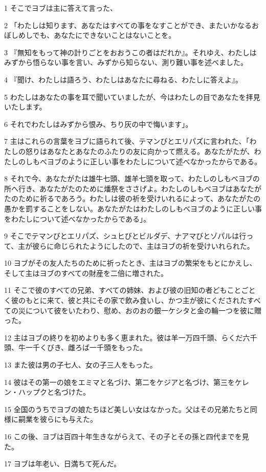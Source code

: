 \par 1 そこでヨブは主に答えて言った、
\par 2 「わたしは知ります、あなたはすべての事をなすことができ、またいかなるおぼしめしでも、あなたにできないことはないことを。
\par 3 『無知をもって神の計りごとをおおうこの者はだれか』。それゆえ、わたしはみずから悟らない事を言い、みずから知らない、測り難い事を述べました。
\par 4 『聞け、わたしは語ろう、わたしはあなたに尋ねる、わたしに答えよ』。
\par 5 わたしはあなたの事を耳で聞いていましたが、今はわたしの目であなたを拝見いたします。
\par 6 それでわたしはみずから恨み、ちり灰の中で悔います」。
\par 7 主はこれらの言葉をヨブに語られて後、テマンびとエリパズに言われた、「わたしの怒りはあなたとあなたのふたりの友に向かって燃える。あなたがたが、わたしのしもべヨブのように正しい事をわたしについて述べなかったからである。
\par 8 それで今、あなたがたは雄牛七頭、雄羊七頭を取って、わたしのしもべヨブの所へ行き、あなたがたのために燔祭をささげよ。わたしのしもべヨブはあなたがたのために祈るであろう。わたしは彼の祈を受けいれるによって、あなたがたの愚かを罰することをしない。あなたがたはわたしのしもべヨブのように正しい事をわたしについて述べなかったからである」。
\par 9 そこでテマンびとエリパズ、シュヒびとビルダデ、ナアマびとゾパルは行って、主が彼らに命じられたようにしたので、主はヨブの祈を受けいれられた。
\par 10 ヨブがその友人たちのために祈ったとき、主はヨブの繁栄をもとにかえし、そして主はヨブのすべての財産を二倍に増された。
\par 11 そこで彼のすべての兄弟、すべての姉妹、および彼の旧知の者どもことごとく彼のもとに来て、彼と共にその家で飲み食いし、かつ主が彼にくだされたすべての災について彼をいたわり、慰め、おのおの銀一ケシタと金の輪一つを彼に贈った。
\par 12 主はヨブの終りを初めよりも多く恵まれた。彼は羊一万四千頭、らくだ六千頭、牛一千くびき、雌ろば一千頭をもった。
\par 13 また彼は男の子七人、女の子三人をもった。
\par 14 彼はその第一の娘をエミマと名づけ、第二をケジアと名づけ、第三をケレン・ハップクと名づけた。
\par 15 全国のうちでヨブの娘たちほど美しい女はなかった。父はその兄弟たちと同様に嗣業を彼らにも与えた。
\par 16 この後、ヨブは百四十年生きながらえて、その子とその孫と四代までを見た。
\par 17 ヨブは年老い、日満ちて死んだ。


